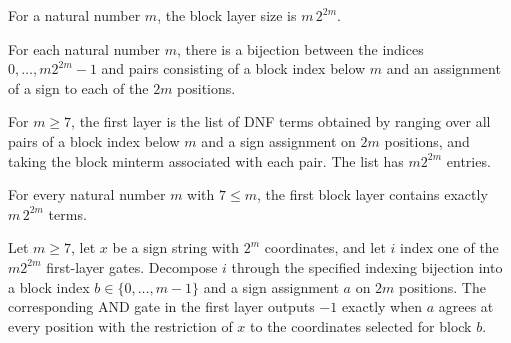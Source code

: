 \begin{definition}
\label{FABL.blockLayerSize}
\leanok
For a natural number $m$, the block layer size is $m\,2^{2m}$.
\end{definition}

\begin{definition}
\label{FABL.blockAssignmentIndexEquiv}
\leanok
{}
For each natural number $m$, there is a bijection between the indices
$0,\ldots,m2^{2m}-1$ and pairs consisting of a block index below $m$ and an assignment
of a sign to each of the $2m$ positions.
\end{definition}

\begin{definition}
\label{FABL.blockFirstLayer}
\leanok
{}
For $m\ge 7$, the first layer is the list of DNF terms obtained by ranging over all
pairs of a block index below $m$ and a sign assignment on $2m$ positions, and taking the
block minterm associated with each pair. The list has $m2^{2m}$ entries.
\end{definition}

\begin{theorem}
\label{FABL.length_blockFirstLayer}
\leanok
{}
For every natural number $m$ with $7\le m$, the first block layer contains exactly
$m\,2^{2m}$ terms.
\end{theorem}

\begin{theorem}
\label{FABL.eval_blockFirstLayer}
\leanok
{}
Let $m\ge 7$, let $x$ be a sign string with $2^m$ coordinates, and let $i$ index one of
the $m2^{2m}$ first-layer gates. Decompose $i$ through the specified indexing bijection
into a block index $b\in\{0,\ldots,m-1\}$ and a sign assignment $a$ on $2m$ positions.
The corresponding AND gate in the first layer outputs $-1$ exactly when $a$ agrees at
every position with the restriction of $x$ to the coordinates selected for block $b$.
\end{theorem}

